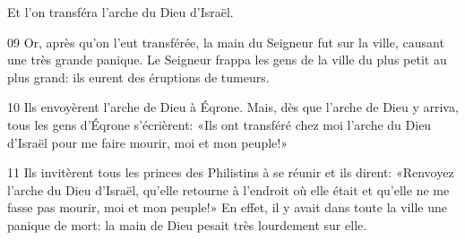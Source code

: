 Et l’on transféra l’arche du Dieu d’Israël.

09 Or, après qu’on l’eut transférée, la main du Seigneur fut sur la ville, causant une très grande panique. Le Seigneur frappa les gens de la ville du plus petit au plus grand: ils eurent des éruptions de tumeurs.

10 Ils envoyèrent l’arche de Dieu à Éqrone. Mais, dès que l’arche de Dieu y arriva, tous les gens d’Éqrone s’écrièrent: «Ils ont transféré chez moi l’arche du Dieu d’Israël pour me faire mourir, moi et mon peuple!»

11 Ils invitèrent tous les princes des Philistins à se réunir et ils dirent: «Renvoyez l’arche du Dieu d’Israël, qu’elle retourne à l’endroit où elle était et qu’elle ne me fasse pas mourir, moi et mon peuple!» En effet, il y avait dans toute la ville une panique de mort: la main de Dieu pesait très lourdement sur elle.
